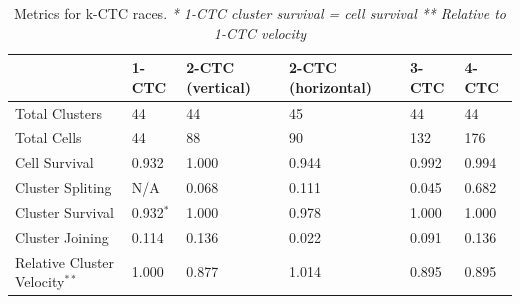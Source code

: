 \documentclass[12pt]{article}
\begin{document}
\begin{table}[h]
    \begin{tabular}{|l|l|l|l|l|l|}
    \hline
    ~                & 1-CTC   & 2-CTC (vertical) & 2-CTC (horizontal) & 3-CTC & 4-CTC \\ \hline
    Total Clusters   & 44      & 44               & 45                 & 44 & 44  \\ \hline
    Total Cells 		 & 44			 & 88							& 90									& 132 & 176 \\ \hline
    Cell Survival    & 0.932  & 1.000         	 & 0.944             & 0.992 & 0.994 \\ \hline
    Cluster Spliting & N/A     & 0.068            & 0.111             & 0.045 & 0.682 \\ \hline
    Cluster Survival & 0.932$^*$ & 1.000            & 0.978             & 1.000 & 1.000 \\ \hline
    Cluster Joining  & 0.114  & 0.136           & 0.022              & 0.091 & 0.136 \\ \hline
    Relative Cluster Velocity$^{**}$ & 1.000       & 0.877      & 1.014     & 0.895  & 0.895 \\ \hline
    \end{tabular}
    \caption{Metrics for k-CTC races.
    \emph{* 1-CTC cluster survival = cell survival}
    \emph{** Relative to 1-CTC velocity}}
    \label{racestats}
\end{table}
\end{document}
